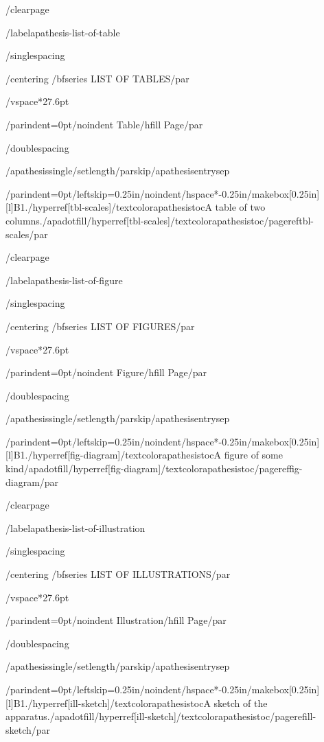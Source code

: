 /clearpage

/label{apathesis-list-of-table}

/singlespacing

{/centering
/bfseries LIST OF TABLES/par}

/vspace*{27.6pt}

{/parindent=0pt/noindent Table/hfill Page/par}

/doublespacing

{/apathesissingle/setlength{/parskip}{/apathesisentrysep}

{/parindent=0pt/leftskip=0.25in/noindent/hspace*{-0.25in}/makebox[0.25in][l]{B1.}/hyperref[tbl-scales]{/textcolor{apathesistoc}{A table of two columns.}}/apadotfill/hyperref[tbl-scales]{/textcolor{apathesistoc}{/pageref{tbl-scales}}}/par}

}

/clearpage

/label{apathesis-list-of-figure}

/singlespacing

{/centering
/bfseries LIST OF FIGURES/par}

/vspace*{27.6pt}

{/parindent=0pt/noindent Figure/hfill Page/par}

/doublespacing

{/apathesissingle/setlength{/parskip}{/apathesisentrysep}

{/parindent=0pt/leftskip=0.25in/noindent/hspace*{-0.25in}/makebox[0.25in][l]{B1.}/hyperref[fig-diagram]{/textcolor{apathesistoc}{A figure of some kind}}/apadotfill/hyperref[fig-diagram]{/textcolor{apathesistoc}{/pageref{fig-diagram}}}/par}

}

/clearpage

/label{apathesis-list-of-illustration}

/singlespacing

{/centering
/bfseries LIST OF ILLUSTRATIONS/par}

/vspace*{27.6pt}

{/parindent=0pt/noindent Illustration/hfill Page/par}

/doublespacing

{/apathesissingle/setlength{/parskip}{/apathesisentrysep}

{/parindent=0pt/leftskip=0.25in/noindent/hspace*{-0.25in}/makebox[0.25in][l]{B1.}/hyperref[ill-sketch]{/textcolor{apathesistoc}{A sketch of the apparatus.}}/apadotfill/hyperref[ill-sketch]{/textcolor{apathesistoc}{/pageref{ill-sketch}}}/par}

}

